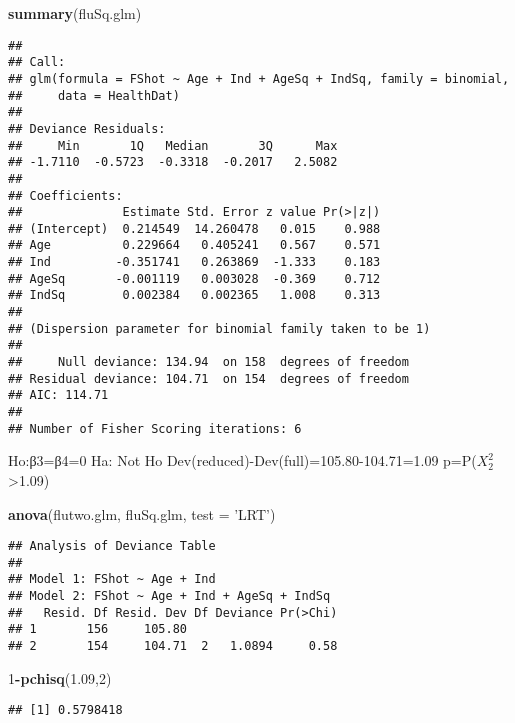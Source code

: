 \documentclass[]{article}
\newenvironment{Shaded}{\begin{snugshade}}{\end{snugshade}}
\newcommand{\KeywordTok}[1]{\textcolor[rgb]{0.13,0.29,0.53}{\textbf{#1}}}
\newcommand{\DataTypeTok}[1]{\textcolor[rgb]{0.13,0.29,0.53}{#1}}
\newcommand{\DecValTok}[1]{\textcolor[rgb]{0.00,0.00,0.81}{#1}}
\newcommand{\FloatTok}[1]{\textcolor[rgb]{0.00,0.00,0.81}{#1}}
\newcommand{\StringTok}[1]{\textcolor[rgb]{0.31,0.60,0.02}{#1}}
\newcommand{\OperatorTok}[1]{\textcolor[rgb]{0.81,0.36,0.00}{\textbf{#1}}}
\newcommand{\NormalTok}[1]{#1}
\begin{document}
\begin{Shaded}
\begin{Highlighting}[]
\KeywordTok{summary}\NormalTok{(fluSq.glm)}
\end{Highlighting}
\end{Shaded}

\begin{verbatim}
## 
## Call:
## glm(formula = FShot ~ Age + Ind + AgeSq + IndSq, family = binomial, 
##     data = HealthDat)
## 
## Deviance Residuals: 
##     Min       1Q   Median       3Q      Max  
## -1.7110  -0.5723  -0.3318  -0.2017   2.5082  
## 
## Coefficients:
##              Estimate Std. Error z value Pr(>|z|)
## (Intercept)  0.214549  14.260478   0.015    0.988
## Age          0.229664   0.405241   0.567    0.571
## Ind         -0.351741   0.263869  -1.333    0.183
## AgeSq       -0.001119   0.003028  -0.369    0.712
## IndSq        0.002384   0.002365   1.008    0.313
## 
## (Dispersion parameter for binomial family taken to be 1)
## 
##     Null deviance: 134.94  on 158  degrees of freedom
## Residual deviance: 104.71  on 154  degrees of freedom
## AIC: 114.71
## 
## Number of Fisher Scoring iterations: 6
\end{verbatim}

Ho:β3=β4=0 Ha: Not Ho Dev(reduced)-Dev(full)=105.80-104.71=1.09
p=P(\(X^2_2\)\textgreater{}1.09)

\begin{Shaded}
\begin{Highlighting}[]
\KeywordTok{anova}\NormalTok{(flutwo.glm, fluSq.glm, }\DataTypeTok{test =} \StringTok{'LRT'}\NormalTok{)}
\end{Highlighting}
\end{Shaded}

\begin{verbatim}
## Analysis of Deviance Table
## 
## Model 1: FShot ~ Age + Ind
## Model 2: FShot ~ Age + Ind + AgeSq + IndSq
##   Resid. Df Resid. Dev Df Deviance Pr(>Chi)
## 1       156     105.80                     
## 2       154     104.71  2   1.0894     0.58
\end{verbatim}

\begin{Shaded}
\begin{Highlighting}[]
\DecValTok{1}\OperatorTok{-}\KeywordTok{pchisq}\NormalTok{(}\FloatTok{1.09}\NormalTok{,}\DecValTok{2}\NormalTok{)}
\end{Highlighting}
\end{Shaded}

\begin{verbatim}
## [1] 0.5798418
\end{verbatim}
\end{document}
